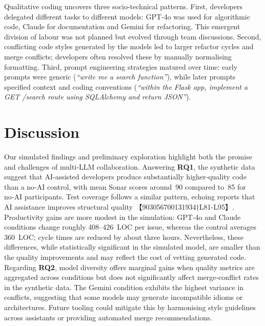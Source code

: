 \documentclass[conference]{IEEEtran}
\begin{document}
Qualitative coding uncovers three socio‑technical patterns.  First, developers delegated different tasks to different models: GPT‑4o was used for algorithmic code, Claude for documentation and Gemini for refactoring.  This emergent division of labour was not planned but evolved through team discussions.  Second, conflicting code styles generated by the models led to larger refactor cycles and merge conflicts; developers often resolved these by manually normalising formatting.  Third, prompt engineering strategies matured over time: early prompts were generic (\emph{“write me a search function”}), while later prompts specified context and coding conventions (\emph{“within the Flask app, implement a GET /search route using SQLAlchemy and return JSON”}).

\section{Discussion}
Our simulated findings and preliminary exploration highlight both the promise and challenges of multi‑LLM collaboration.  Answering \textbf{RQ1}, the synthetic data suggest that AI‑assisted developers produce substantially higher‑quality code than a no‑AI control, with mean Sonar scores around 90 compared to 85 for no‑AI participants.  Test coverage follows a similar pattern, echoing reports that AI assistance improves structural quality 【903056700131934†L81-L95】.  Productivity gains are more modest in the simulation: GPT‑4o and Claude conditions change roughly 408–426 LOC per issue, whereas the control averages 360 LOC; cycle times are reduced by about three hours.  Nevertheless, these differences, while statistically significant in the simulated model, are smaller than the quality improvements and may reflect the cost of vetting generated code.  Regarding \textbf{RQ2}, model diversity offers marginal gains when quality metrics are aggregated across conditions but does not significantly affect merge‑conflict rates in the synthetic data.  The Gemini condition exhibits the highest variance in conflicts, suggesting that some models may generate incompatible idioms or architectures.  Future tooling could mitigate this by harmonising style guidelines across assistants or providing automated merge recommendations.
\end{document}
